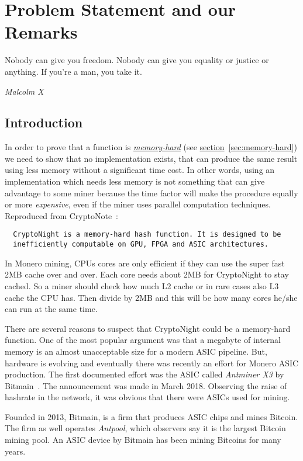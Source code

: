 \chapter{Problem Statement and our Remarks}
%
%
\epigraph{Nobody can give you freedom. Nobody can give you equality or justice or anything. If you're a man, you take it.}{\textit{Malcolm X}}
%
\section{Introduction}
In order to prove that a function is \hyperref[sec:memory-hard]{\emph{memory-hard}} (see \hyperref[sec:memory-hard]{section}~\ref{sec:memory-hard}) we need to show that no implementation exists, that can produce the same result using less memory without a significant time cost. In other words, using an implementation which needs less memory is not something that can give advantage to some miner because the time factor will make the procedure equally or more \emph{expensive}, even if the miner uses parallel computation techniques. Reproduced from CryptoNote~\cite{cryptonight}:
\begin{verbatim}
  CryptoNight is a memory-hard hash function. It is designed to be
  inefficiently computable on GPU, FPGA and ASIC architectures.
\end{verbatim}

In Monero mining, CPUs cores are only efficient if they can use the super fast 2MB cache over and over. Each core needs about 2MB for CryptoNight to stay cached. So a miner should check how much L2 cache or in rare cases also L3 cache the CPU has. Then divide by 2MB and this will be how many cores he/she can run at the same time.

There are several reasons to suspect that CryptoNight could be a memory-hard function. One of the most popular argument was that a megabyte of internal memory is an almost unacceptable size for a modern ASIC pipeline. But, hardware is evolving and eventually there was recently an effort for Monero ASIC production. The first documented effort was the ASIC called \emph{Antminer X3} by Bitmain~\cite{bitmain}. The announcement was made in March 2018. Observing the raise of hashrate in the network, it was obvious that there were ASICs used for mining.

Founded in 2013, Bitmain, is a firm that produces ASIC chips and mines Bitcoin. The firm as well operates \emph{Antpool}, which observers say it is the largest Bitcoin mining pool. An ASIC device by Bitmain has been mining Bitcoins for many years.

